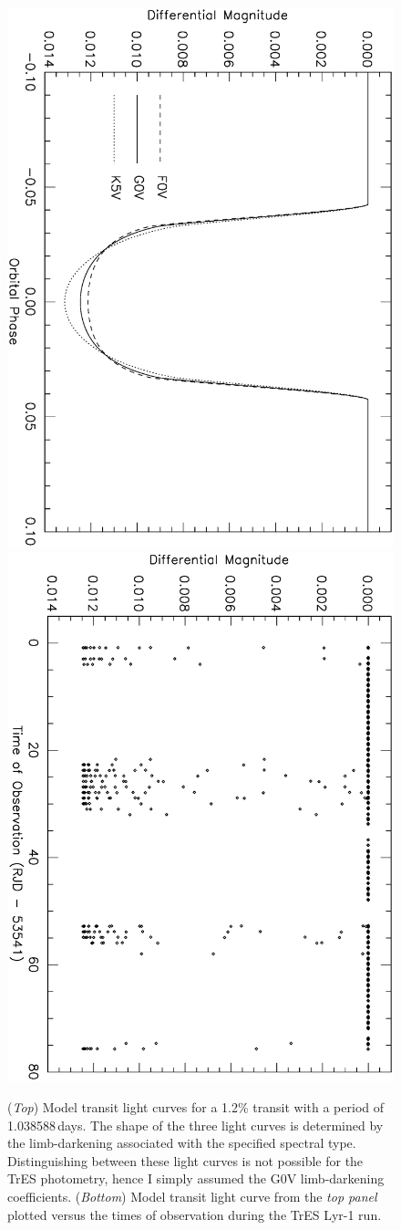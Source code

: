 \begin{figure}
\begin{center}
\centering
\includegraphics[width=.55\textwidth, angle=90]{7_agol_a}\\
\includegraphics[width=.55\textwidth, angle=90]{7_agol_b}\\
\caption[Example of model transits]{%
({\it Top}) %
Model transit light curves for a 1.2\% transit with a period of 1.038588\,days. 
The shape of the three light curves is determined by the limb-darkening associated with the specified spectral type. 
Distinguishing between these light curves is not possible for the TrES photometry, hence I simply assumed the G0V limb-darkening coefficients.
({\it Bottom}) Model transit light curve from the {\it top panel} plotted versus the times of observation during the TrES Lyr-1 run. %
}%
\label{cha:human:sec:model:fig:agol}%
\end{center}
\end{figure}


